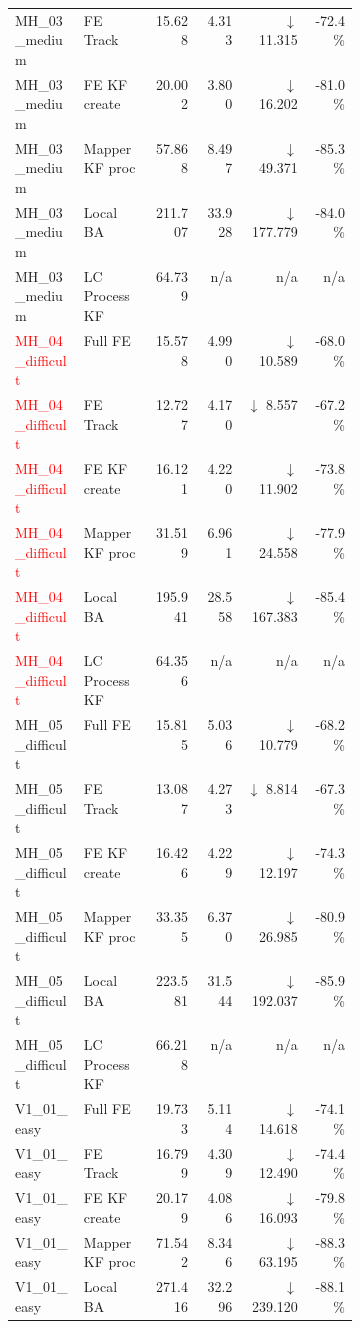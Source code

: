 \documentclass[11pt]{article}
\begin{document}
\begin{longtable}{@{}>{\raggedright\arraybackslash}p{0.20\linewidth}>{\raggedright\arraybackslash}p{0.20\linewidth}rrrr@{}}
MH\_03\_medium & FE Track & 15.628 & 4.313 & $\downarrow$ 11.315 & -72.4\% \\
MH\_03\_medium & FE KF create & 20.002 & 3.800 & $\downarrow$ 16.202 & -81.0\% \\
MH\_03\_medium & Mapper KF proc & 57.868 & 8.497 & $\downarrow$ 49.371 & -85.3\% \\
MH\_03\_medium & Local BA & 211.707 & 33.928 & $\downarrow$ 177.779 & -84.0\% \\
MH\_03\_medium & LC ProcessKF & 64.739 & n/a & n/a & n/a \\
\textcolor{red}{MH\_04\_difficult} & Full FE & 15.578 & 4.990 & $\downarrow$ 10.589 & -68.0\% \\
\textcolor{red}{MH\_04\_difficult} & FE Track & 12.727 & 4.170 & $\downarrow$ 8.557 & -67.2\% \\
\textcolor{red}{MH\_04\_difficult} & FE KF create & 16.121 & 4.220 & $\downarrow$ 11.902 & -73.8\% \\
\textcolor{red}{MH\_04\_difficult} & Mapper KF proc & 31.519 & 6.961 & $\downarrow$ 24.558 & -77.9\% \\
\textcolor{red}{MH\_04\_difficult} & Local BA & 195.941 & 28.558 & $\downarrow$ 167.383 & -85.4\% \\
\textcolor{red}{MH\_04\_difficult} & LC ProcessKF & 64.356 & n/a & n/a & n/a \\
MH\_05\_difficult & Full FE & 15.815 & 5.036 & $\downarrow$ 10.779 & -68.2\% \\
MH\_05\_difficult & FE Track & 13.087 & 4.273 & $\downarrow$ 8.814 & -67.3\% \\
MH\_05\_difficult & FE KF create & 16.426 & 4.229 & $\downarrow$ 12.197 & -74.3\% \\
MH\_05\_difficult & Mapper KF proc & 33.355 & 6.370 & $\downarrow$ 26.985 & -80.9\% \\
MH\_05\_difficult & Local BA & 223.581 & 31.544 & $\downarrow$ 192.037 & -85.9\% \\
MH\_05\_difficult & LC ProcessKF & 66.218 & n/a & n/a & n/a \\
V1\_01\_easy & Full FE & 19.733 & 5.114 & $\downarrow$ 14.618 & -74.1\% \\
V1\_01\_easy & FE Track & 16.799 & 4.309 & $\downarrow$ 12.490 & -74.4\% \\
V1\_01\_easy & FE KF create & 20.179 & 4.086 & $\downarrow$ 16.093 & -79.8\% \\
V1\_01\_easy & Mapper KF proc & 71.542 & 8.346 & $\downarrow$ 63.195 & -88.3\% \\
V1\_01\_easy & Local BA & 271.416 & 32.296 & $\downarrow$ 239.120 & -88.1\% \\

\end{longtable}
\end{document}
